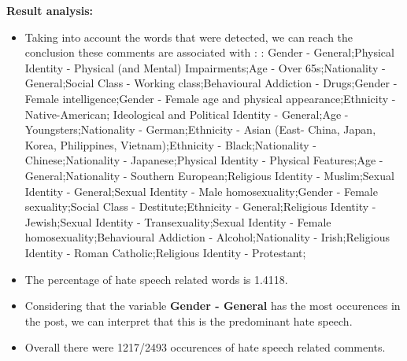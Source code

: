 \documentclass[11pt]{article}
\begin{document}
\textbf{\Large Result analysis:}

\begin{itemize}\item Taking into account the words that were detected, we can reach the conclusion these comments are associated with : : Gender - General;Physical Identity - Physical (and Mental) Impairments;Age - Over 65s;Nationality - General;Social Class - Working class;Behavioural Addiction - Drugs;Gender - Female intelligence;Gender - Female age and physical appearance;Ethnicity - Native-American; Ideological and Political Identity - General;Age - Youngsters;Nationality - German;Ethnicity - Asian (East- China, Japan, Korea, Philippines, Vietnam);Ethnicity - Black;Nationality - Chinese;Nationality - Japanese;Physical Identity - Physical Features;Age - General;Nationality - Southern European;Religious Identity - Muslim;Sexual Identity - General;Sexual Identity - Male homosexuality;Gender - Female sexuality;Social Class - Destitute;Ethnicity - General;Religious Identity - Jewish;Sexual Identity - Transexuality;Sexual Identity - Female homosexuality;Behavioural Addiction - Alcohol;Nationality - Irish;Religious Identity - Roman Catholic;Religious Identity - Protestant;%

\item The percentage of hate speech related words is 1.4118.

\item Considering that the variable \textbf{Gender - General} has the most occurences in the post, we can interpret that this is the predominant hate speech.

\item Overall there were 1217/2493 occurences of hate speech related comments.\end{itemize}
\end{document}
